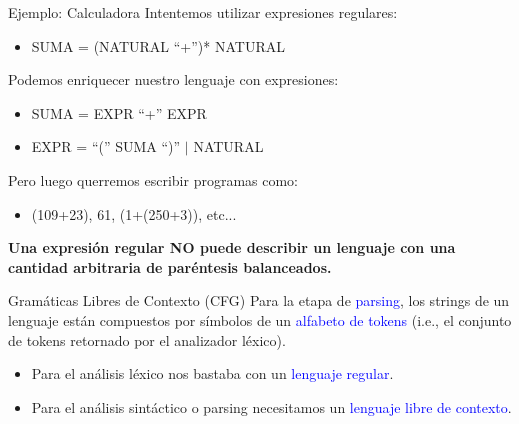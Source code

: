 \documentclass[handout]{beamer} %
\newcommand{\blue}[1]{\textcolor{blue}{#1}}
\begin{document}
\begin{frame}{Ejemplo: Calculadora}
    Intentemos utilizar expresiones regulares:
    \begin{itemize}
        \item SUMA = (NATURAL ``+'')* NATURAL
    \end{itemize}
    \pause 
    
    Podemos enriquecer nuestro lenguaje con expresiones:
    \begin{itemize}
        \item SUMA = EXPR ``+'' EXPR
        \item EXPR = ``('' SUMA ``)'' $\mid$ NATURAL
    \end{itemize}
    \pause 
    
    Pero luego querremos escribir programas como:
    \begin{itemize}
        \item (109+23), 61, (1+(250+3)), etc...
    \end{itemize}
    \pause
    
    \textbf{Una expresión regular NO puede describir un lenguaje con una cantidad arbitraria de paréntesis balanceados.}
\end{frame}

\begin{frame}{Gramáticas Libres de Contexto (CFG)}
    Para la etapa de \blue{parsing}, los strings de un lenguaje están compuestos por símbolos de un \blue{alfabeto de tokens} (i.e., el conjunto de tokens retornado por el analizador léxico).
    \begin{itemize}
        \item<2-> Para el análisis léxico nos bastaba con un \blue{lenguaje regular}.
        \item<2-> Para el análisis sintáctico o parsing necesitamos un \blue{lenguaje libre de contexto}.
    \end{itemize}
\end{frame}
\end{document}
